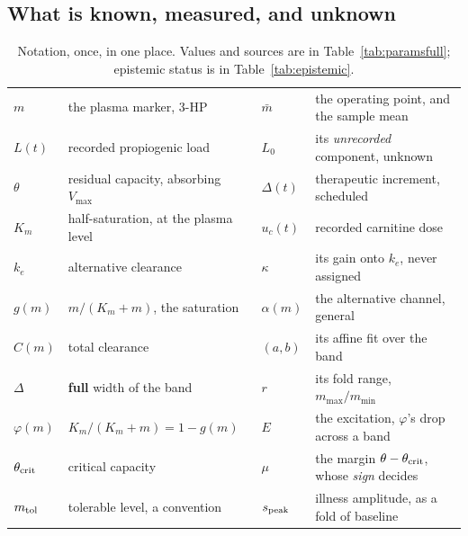 \subsection{What is known, measured, and unknown}

\begin{table}[htbp]
\centering
\footnotesize
\caption{\label{tab:notation_orig}Notation, once, in one place. Values and sources are in
Table~\ref{tab:paramsfull}; epistemic status is in Table~\ref{tab:epistemic}.}
\begin{tabular}{@{}ll@{\hskip 2em}ll@{}}
\toprule
$m$ & the plasma marker, 3-HP & $\bar m$ & the operating point, and the sample mean \\
$L(t)$ & recorded propiogenic load & $L_0$ & its \emph{unrecorded} component, unknown \\
$\theta$ & residual capacity, absorbing $V_{\max}$ & $\Delta(t)$ & therapeutic increment,
scheduled \\
$K_m$ & half-saturation, at the plasma level & $u_c(t)$ & recorded carnitine dose \\
$k_e$ & alternative clearance & $\kappa$ & its gain onto $k_e$, never assigned \\
$g(m)$ & $m/(K_m+m)$, the saturation & $\alpha(m)$ & the alternative channel, general \\
$C(m)$ & total clearance & $(a,b)$ & its affine fit over the band \\
$\Delta$ & \textbf{full} width of the band & $r$ & its fold range, $m_{\max}/m_{\min}$ \\
$\varphi(m)$ & $K_m/(K_m+m) = 1-g(m)$ & $E$ & the excitation, $\varphi$'s drop across a
band \\
$\theta_{\mathrm{crit}}$ & critical capacity & $\mu$ & the margin $\theta - \theta_{\mathrm{crit}}$, whose \emph{sign} decides \\
$m_{\mathrm{tol}}$ & tolerable level, a convention & $s_{\mathrm{peak}}$ & illness amplitude, as a fold of baseline \\
\bottomrule
\end{tabular}
\end{table}

